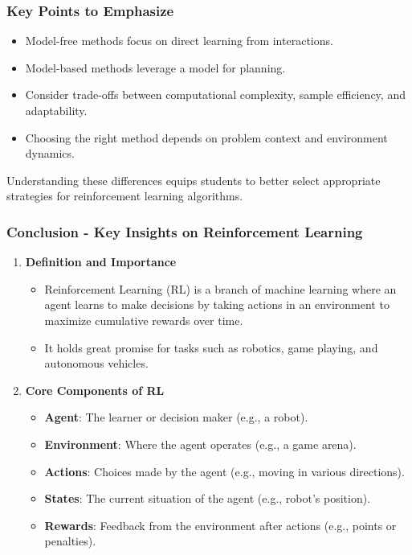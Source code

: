 \documentclass[aspectratio=169]{beamer}
\begin{document}
\begin{frame}[fragile]
    \frametitle{Key Points to Emphasize}
    \begin{itemize}
        \item Model-free methods focus on direct learning from interactions. 
        \item Model-based methods leverage a model for planning.
        \item Consider trade-offs between computational complexity, sample efficiency, and adaptability.
        \item Choosing the right method depends on problem context and environment dynamics.
    \end{itemize}

    Understanding these differences equips students to better select appropriate strategies for reinforcement learning algorithms.
\end{frame}

\begin{frame}[fragile]
    \frametitle{Conclusion - Key Insights on Reinforcement Learning}
    \begin{enumerate}
        \item \textbf{Definition and Importance}
        \begin{itemize}
            \item Reinforcement Learning (RL) is a branch of machine learning where an agent learns to make decisions by taking actions in an environment to maximize cumulative rewards over time. 
            \item It holds great promise for tasks such as robotics, game playing, and autonomous vehicles.
        \end{itemize}

        \item \textbf{Core Components of RL}
        \begin{itemize}
            \item \textbf{Agent}: The learner or decision maker (e.g., a robot).
            \item \textbf{Environment}: Where the agent operates (e.g., a game arena).
            \item \textbf{Actions}: Choices made by the agent (e.g., moving in various directions).
            \item \textbf{States}: The current situation of the agent (e.g., robot's position).
            \item \textbf{Rewards}: Feedback from the environment after actions (e.g., points or penalties).
        \end{itemize}
    \end{enumerate}
\end{frame}
\end{document}
